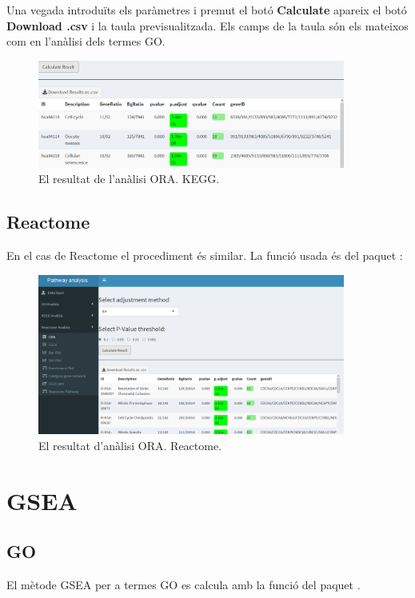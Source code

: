Una vegada introduïts els paràmetres i premut el botó \textbf{Calculate} apareix el botó \textbf{Download .csv} i la taula previsualitzada. Els camps de la taula són els mateixos com en l'anàlisi dels termes GO.
\begin{figure}[H]
\centering
\includegraphics[width=0.9\textwidth]{figures/App_F9_Items_KEGG_ORA_Table.png} 
\caption{El resultat de l'anàlisi ORA. KEGG.}
\end{figure}

\subsection{Reactome}
En el cas de Reactome el procediment és similar. La funció usada és  del paquet :


\begin{figure}[H]
\centering
\includegraphics[width=0.9\textwidth]{figures/App_F10_Items_Reactome_ORA.png} 
\caption{El resultat d'anàlisi ORA. Reactome.}
\end{figure}

\section{GSEA}
\subsection{GO}
El mètode GSEA per a termes GO es calcula amb la funció  del paquet . 

